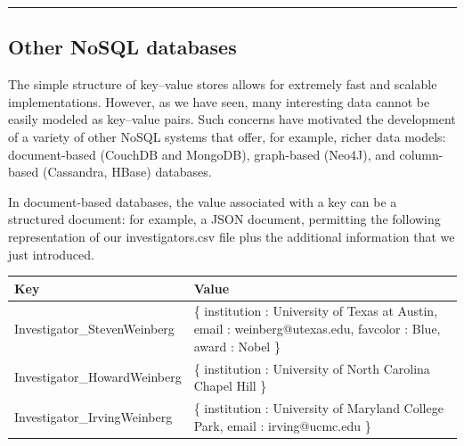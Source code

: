 \documentclass[]{krantz}
\begin{document}
\begin{center}\rule{0.5\linewidth}{\linethickness}\end{center}

\subsection{Other NoSQL databases}\label{other-nosql-databases}

The simple structure of key--value stores allows for extremely fast and
scalable implementations. However, as we have seen, many interesting
data cannot be easily modeled as key--value pairs. Such concerns have
motivated the development of a variety of other NoSQL systems that
offer, for example, richer data models: document-based (CouchDB and
MongoDB), graph-based (Neo4J), and column-based (Cassandra, HBase)
databases.

In document-based databases, the value associated with a key can be a
structured document: for example, a JSON document, permitting the
following representation of our investigators.csv file plus the
additional information that we just introduced.

\begin{longtable}[]{@{}ll@{}}
\toprule
\begin{minipage}[b]{0.14\columnwidth}\raggedright\strut
\textbf{Key}\strut
\end{minipage} & \begin{minipage}[b]{0.14\columnwidth}\raggedright\strut
\textbf{Value}\strut
\end{minipage}\tabularnewline
\midrule
\endhead
\begin{minipage}[t]{0.14\columnwidth}\raggedright\strut
Investigator\_StevenWeinberg\strut
\end{minipage} & \begin{minipage}[t]{0.14\columnwidth}\raggedright\strut
\{ institution : University of Texas at Austin, email :
weinberg@utexas.edu, favcolor : Blue, award : Nobel \}\strut
\end{minipage}\tabularnewline
\begin{minipage}[t]{0.14\columnwidth}\raggedright\strut
Investigator\_HowardWeinberg\strut
\end{minipage} & \begin{minipage}[t]{0.14\columnwidth}\raggedright\strut
\{ institution : University of North Carolina Chapel Hill \}\strut
\end{minipage}\tabularnewline
\begin{minipage}[t]{0.14\columnwidth}\raggedright\strut
Investigator\_IrvingWeinberg\strut
\end{minipage} & \begin{minipage}[t]{0.14\columnwidth}\raggedright\strut
\{ institution : University of Maryland College Park, email :
irving@ucmc.edu \}\strut
\end{minipage}\tabularnewline
\bottomrule
\end{longtable}
\end{document}
